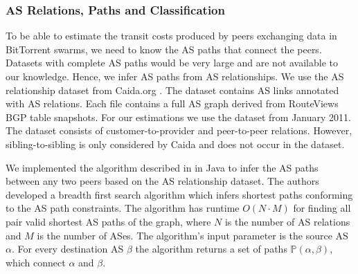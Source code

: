 
\subsubsection{AS Relations, Paths and Classification}

To be able to estimate the transit costs produced by peers exchanging data in BitTorrent swarms, we need to know the AS paths that connect the peers. Datasets with complete AS paths would be very large and are not available to our knowledge. Hence, we infer AS paths from AS relationships.
We use the AS relationship dataset from Caida.org \cite{caidaas}. The dataset contains AS links annotated with AS relations. Each file contains a full AS graph derived from RouteViews BGP table snapshots. For our estimations we use the dataset from January 2011. The dataset consists of customer-to-provider and peer-to-peer relations. However, sibling-to-sibling is only considered by Caida and does not occur in the dataset.

We implemented the algorithm described in \cite{yang2009efficient} in Java to infer the AS paths between any two peers based on the AS relationship dataset. The authors developed a breadth first search algorithm which infers shortest paths conforming to the AS path constraints. The algorithm has runtime $O(N\cdot M)$ for finding all pair valid shortest AS paths of the graph, where $N$ is the number of AS relations and $M$ is the number of ASes.
The algorithm's input parameter is the source AS $\alpha$. For every destination AS $\beta$ the algorithm returns a set of paths $\mathbb{P}(\alpha,\beta)$, which connect $\alpha$ and $\beta$.

